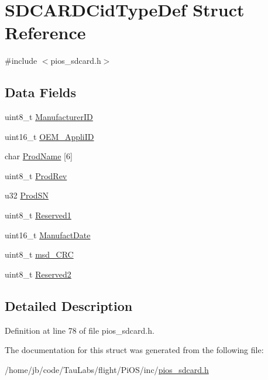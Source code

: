 \hypertarget{struct_s_d_c_a_r_d_cid_type_def}{\section{\-S\-D\-C\-A\-R\-D\-Cid\-Type\-Def \-Struct \-Reference}
\label{struct_s_d_c_a_r_d_cid_type_def}
}


{\ttfamily \#include $<$pios\-\_\-sdcard.\-h$>$}

\subsection*{\-Data \-Fields}
\begin{DoxyCompactItemize}
\item 
uint8\-\_\-t \hyperlink{group___p_i_o_s___s_d_c_a_r_d_ga083dff8fb19fcec5bf79ab18c105b6c3}{\-Manufacturer\-I\-D}
\item 
uint16\-\_\-t \hyperlink{group___p_i_o_s___s_d_c_a_r_d_gaba70fef7b702c2d5dc086c3cc997d4bc}{\-O\-E\-M\-\_\-\-Appli\-I\-D}
\item 
char \hyperlink{group___p_i_o_s___s_d_c_a_r_d_gad17afffd675a78059aa60101165d709d}{\-Prod\-Name} \mbox{[}6\mbox{]}
\item 
uint8\-\_\-t \hyperlink{group___p_i_o_s___s_d_c_a_r_d_ga8307b63b043ed01d0fa11493c9508dac}{\-Prod\-Rev}
\item 
u32 \hyperlink{group___p_i_o_s___s_d_c_a_r_d_ga243ea864815caa90de7e151c8d8a7195}{\-Prod\-S\-N}
\item 
uint8\-\_\-t \hyperlink{group___p_i_o_s___s_d_c_a_r_d_gaa6d5ceee00ac588d04a7d1e913746732}{\-Reserved1}
\item 
uint16\-\_\-t \hyperlink{group___p_i_o_s___s_d_c_a_r_d_gae7c9d488577977c2c5c2baca30ca6cec}{\-Manufact\-Date}
\item 
uint8\-\_\-t \hyperlink{group___p_i_o_s___s_d_c_a_r_d_gaeafc9f7dae979dcf639b88246bbe29b6}{msd\-\_\-\-C\-R\-C}
\item 
uint8\-\_\-t \hyperlink{group___p_i_o_s___s_d_c_a_r_d_gab50b795387215c00e5d9b5feb7e9aefb}{\-Reserved2}
\end{DoxyCompactItemize}


\subsection{\-Detailed \-Description}


\-Definition at line 78 of file pios\-\_\-sdcard.\-h.



\-The documentation for this struct was generated from the following file\-:\begin{DoxyCompactItemize}
\item 
/home/jb/code/\-Tau\-Labs/flight/\-Pi\-O\-S/inc/\hyperlink{pios__sdcard_8h}{pios\-\_\-sdcard.\-h}\end{DoxyCompactItemize}
